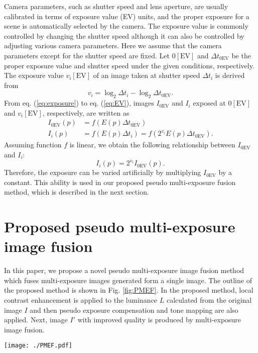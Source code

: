 \documentclass[paper]{ieice}
\begin{document}
  Camera parameters, such as shutter speed and lens aperture,
  are usually calibrated in terms of exposure value (EV) units,
  and the proper exposure for a scene is automatically selected by the camera.
  The exposure value is commonly controlled by changing the shutter speed
  although it can also be controlled by adjusting various camera parameters.
  Here we assume that the camera parameters except for the shutter speed are fixed.
  Let $0 \mathrm{[EV]}$ and $\Delta t_{0 \mathrm{EV}}$ be the proper exposure value
  and shutter speed under the given conditions, respectively.
  The exposure value $v_i \mathrm{[EV]}$ of an image taken at shutter speed $\Delta t_i$
  is derived from
  \begin{equation}
    v_i = \log_2 \Delta t_i - \log_2 \Delta t_{0 \mathrm{EV}} .
    \label{eq:EV}
  \end{equation}
  From eq. (\ref{eq:exposure}) to eq. (\ref{eq:EV}),
  images $I_{0 \mathrm{EV}}$ and $I_i$ exposed at $0 \mathrm{[EV]}$ and $v_i \mathrm{[EV]}$,
  respectively, are written as
  \begin{align}
    I_{0 \mathrm{EV}}(p) &= f(E(p)\Delta t_{0 \mathrm{EV}}) \label{eq:CRFwithExposure}\\
    I_i(p) &= f(E(p)\Delta t_i) \label{eq:CRFwithExposure2}
    = f(2^{v_i} E(p)\Delta t_{0 \mathrm{EV}}) .
  \end{align}
  Assuming function $f$ is linear,
  we obtain the following relationship between $I_{0 \mathrm{EV}}$ and $I_i$:
  \begin{equation}
    I_i(p) = 2^{v_i} I_{0 \mathrm{EV}}(p) .
    \label{eq:relationship}
  \end{equation}
  Therefore, the exposure can be varied artificially by multiplying $I_{0 \mathrm{EV}}$
  by a constant.
  This ability is used in our proposed pseudo multi-exposure fusion method,
  which is described in the next section.
%
\section{Proposed pseudo multi-exposure image fusion}
  In this paper, we propose a novel pseudo multi-exposure image fusion method
  which fuses multi-exposure images generated form a single image.
  The outline of the proposed method is shown in Fig. \ref{fig:PMEF}.
  In the proposed method, local contrast enhancement is applied to
  the luminance $L$ calculated from the original image $I$ and then
  pseudo exposure compensation and tone mapping are also applied.
  Next, image $I'$ with improved quality is produced by multi-exposure image fusion.
%
  \begin{figure*}[!t]
    \centering
    \texttt{[image: ./PMEF.pdf]}
    \caption{Outline of proposed method \label{fig:PMEF}}
  \end{figure*}
%
\end{document}
